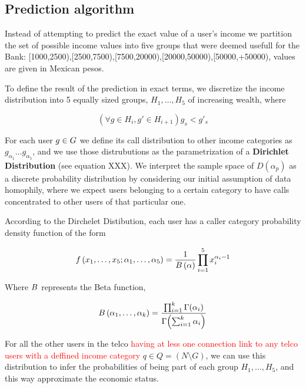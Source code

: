 \subsection{Prediction algorithm}

Instead of attempting to predict the exact value of a user's income we partition the set of possible income values into five groups that were deemed usefull for the Bank: [1000,2500),[2500,7500),[7500,20000),[20000,50000),[50000,+50000), values are given in Mexican pesos.  

To define the result of the prediction in exact terms, we discretize the income distribution into 5 equally sized groups, $ H_1, \ldots, H_5 $ of increasing wealth, where

\[
\left( \forall g \in H_i, g' \in H_{i + 1} \right) g_s < g'_s
\]

For each user $ g \in \mathlarger{G} $ we define its call distribution to other income categories as $ g_{\alpha_1} \ldots g_{\alpha_5} $, and we use those distrubutions as the parametrization of a \textbf{Dirichlet Distribution} (see equation XXX). We interpret the sample space of $ D(\alpha_p) $ as a discrete probability distribution by considering our initial assumption of data homophily, where we expect users belonging to a certain category to have calls concentrated to other users of that particular one.

According to the Dirchelet Distibution, each user has a caller category probability density function of the form

\[
f \left( x_1, \ldots, x_5; \alpha_1, \ldots, \alpha_5 \right) = \frac{1}{B \left( \alpha \right)} \prod^5_{i = 1} x_i^{\alpha_i - 1}
\]

Where $ B $ represents the Beta function,

\[
B \left( \alpha_1, \ldots, \alpha_k \right) = \frac{\prod^k_{i = 1} \Gamma \! \left( \alpha_i \right)}{\Gamma \! \left( \sum^k_{i = 1} \alpha_i \right) }
\]

For all the other users in the telco \textcolor{red}{having at less one connection link to any telco users with a deffined income category} $ q \in Q = (N \setminus G) $, we can use this distribution to infer the probabilities of being part of each group $ H_1, \ldots, H_5 $, and this way approximate the economic status.





